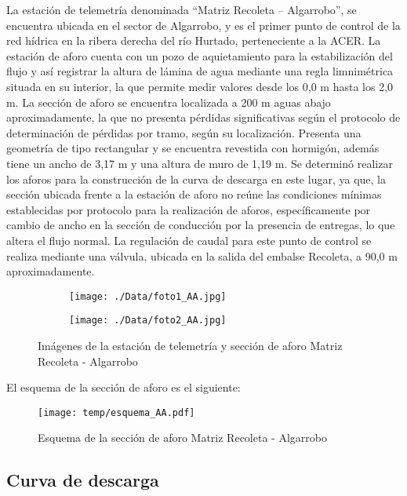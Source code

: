\documentclass[]{article}
\begin{document}
La estación de telemetría denominada ``Matriz Recoleta – Algarrobo'', se encuentra ubicada en el sector de Algarrobo, y es el primer punto de control de la red hídrica en la ribera derecha del río Hurtado, perteneciente a la ACER. La estación de aforo cuenta con un pozo de aquietamiento para la estabilización del flujo y así registrar la altura de lámina de agua mediante una regla limnimétrica situada en su interior, la que permite medir valores desde los 0,0 m hasta los 2,0 m. La sección de aforo se encuentra localizada a 200 m aguas abajo aproximadamente, la que no presenta pérdidas significativas según el protocolo de determinación de pérdidas por tramo, según su localización. Presenta una geometría de tipo rectangular y se encuentra revestida con hormigón, además tiene un ancho de 3,17 m y una altura de muro de 1,19 m. Se determinó realizar los aforos para la construcción de la curva de descarga en este lugar, ya que, la sección ubicada frente a la estación de aforo no reúne las condiciones mínimas establecidas por protocolo para la realización de aforos, específicamente por cambio de ancho en la sección de conducción por la presencia de entregas, lo que altera el flujo normal. La regulación de caudal para este punto de control se realiza mediante una válvula, ubicada en la salida del embalse Recoleta, a 90,0 m aproximadamente.

\begin{figure}[H]
  \centering
\begin{subfigure}{.49\textwidth}
  \texttt{[image: ./Data/foto1\_AA.jpg]}
\end{subfigure}
\hfill
\begin{subfigure}{.49\textwidth}
  \texttt{[image: ./Data/foto2\_AA.jpg]}
\end{subfigure}
\caption{Imágenes de la estación de telemetría y sección de aforo Matriz Recoleta - Algarrobo}
\label{fig:fotos_1}
\end{figure}

El esquema de la sección de aforo es el siguiente:

\begin{figure}[H]
  \centering
  \texttt{[image: temp/esquema\_AA.pdf]}
\caption{Esquema de la sección de aforo Matriz Recoleta - Algarrobo}
\label{fig:Esquema_AA}
\end{figure}

\subsection{Curva de descarga}\label{curva-de-descarga}
\end{document}
